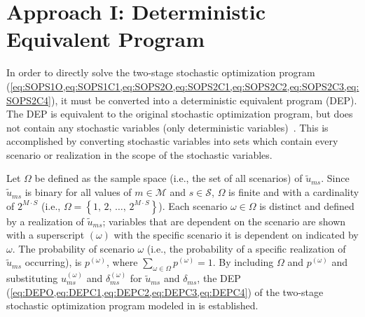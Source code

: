 \documentclass[12pt,dvipsnames]{report}
\begin{document}
\section{Approach I: Deterministic Equivalent Program} \label{sec:dep}

In order to directly solve the two-stage stochastic optimization program (\cref{eq:SOPS1O,eq:SOPS1C1,eq:SOPS2O,eq:SOPS2C1,eq:SOPS2C2,eq:SOPS2C3,eq:SOPS2C4}), it must be converted into a deterministic equivalent program (DEP).  The DEP is equivalent to the original stochastic optimization program, but does not contain any stochastic variables (only deterministic variables)~\cite{stochprogramming}.  This is accomplished by converting stochastic variables into sets which contain every scenario or realization in the scope of the stochastic variables.

Let $\Omega$ be defined as the sample space (i.e., the set of all scenarios) of $\tilde{u}_{ms}$.  Since $\tilde{u}_{ms}$ is binary for all values of $m \in \mathcal{M}$ and $s \in \mathcal{S}$, $\Omega$ is finite and with a cardinality of $2^{M \cdot S}$ (i.e., $\Omega = \left\{ 1,\, 2,\, \ldots,\, 2^{M \cdot S} \right\}$).  Each scenario $\omega \in \Omega$ is distinct and defined by a realization of $\tilde{u}_{ms}$; variables that are dependent on the scenario are shown with a superscript $\left( \omega \right)$ with the specific scenario it is dependent on indicated by $\omega$.  The probability of scenario $\omega$ (i.e., the probability of a specific realization of $\tilde{u}_{ms}$ occurring), is $p^{\left( \omega \right)}$, where $\sum_{\omega \in \Omega} p^{\left( \omega \right)} = 1$.  By including $\Omega$ and $p^{\left( \omega \right)}$ and substituting $u_{ms}^{\left( \omega \right)}$ and $\delta_{ms}^{\left( \omega \right)}$ for $\tilde{u}_{ms}$ and $\delta_{ms}$, the DEP (\cref{eq:DEPO,eq:DEPC1,eq:DEPC2,eq:DEPC3,eq:DEPC4}) of the two-stage stochastic optimization program modeled in  is established.
\end{document}
